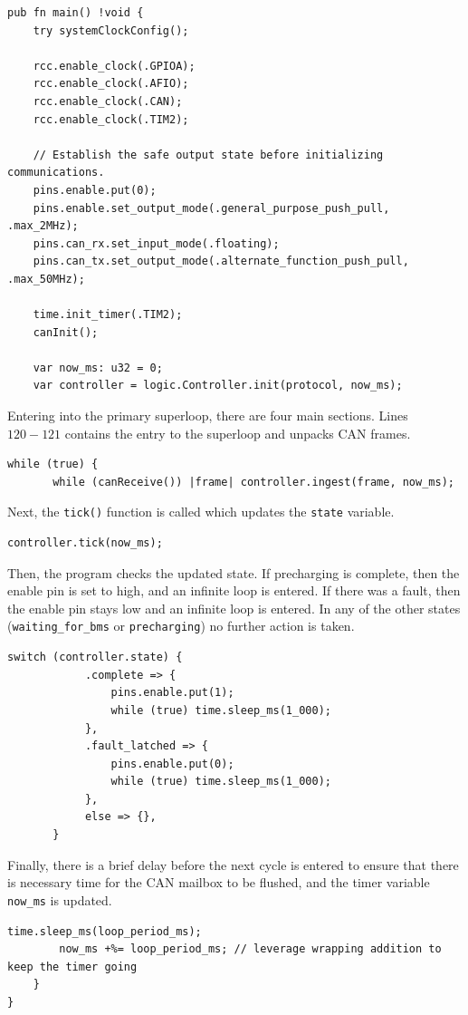\documentclass{article}
\begin{document}
\begin{lstlisting}[language=Zig, firstnumber=101]
pub fn main() !void {
    try systemClockConfig();

    rcc.enable_clock(.GPIOA);
    rcc.enable_clock(.AFIO);
    rcc.enable_clock(.CAN);
    rcc.enable_clock(.TIM2);

    // Establish the safe output state before initializing communications.
    pins.enable.put(0);
    pins.enable.set_output_mode(.general_purpose_push_pull, .max_2MHz);
    pins.can_rx.set_input_mode(.floating);
    pins.can_tx.set_output_mode(.alternate_function_push_pull, .max_50MHz);

    time.init_timer(.TIM2);
    canInit();

    var now_ms: u32 = 0;
    var controller = logic.Controller.init(protocol, now_ms);
\end{lstlisting}

Entering into the primary superloop, there are four main sections. Lines $120-121$ contains the entry to the superloop and unpacks CAN frames.
\begin{lstlisting}[language=Zig, firstnumber=120]
    while (true) {
       while (canReceive()) |frame| controller.ingest(frame, now_ms);
\end{lstlisting}

Next, the \texttt{tick()} function is called which updates the \texttt{state} variable.
\begin{lstlisting}[language=Zig, firstnumber=122]
        controller.tick(now_ms);
\end{lstlisting}

Then, the program checks the updated state. If precharging is complete, then the enable pin is set to high, and an infinite loop is entered. If there was a fault, then the enable pin stays low and an infinite loop is entered. In any of the other states (\texttt{waiting\_for\_bms} or \texttt{precharging}) no further action is taken.
\begin{lstlisting}[language=Zig, firstnumber=last]
        switch (controller.state) {
            .complete => {
                pins.enable.put(1);
                while (true) time.sleep_ms(1_000);
            },
            .fault_latched => {
                pins.enable.put(0);
                while (true) time.sleep_ms(1_000);
            },
            else => {},
       }
\end{lstlisting}

Finally, there is a brief delay before the next cycle is entered to ensure that there is necessary time for the CAN mailbox to be flushed, and the timer variable \texttt{now\_ms} is updated.
\begin{lstlisting}[language=Zig, firstnumber=last]
        time.sleep_ms(loop_period_ms);
        now_ms +%= loop_period_ms; // leverage wrapping addition to keep the timer going 
    }
}
\end{lstlisting}
\end{document}
